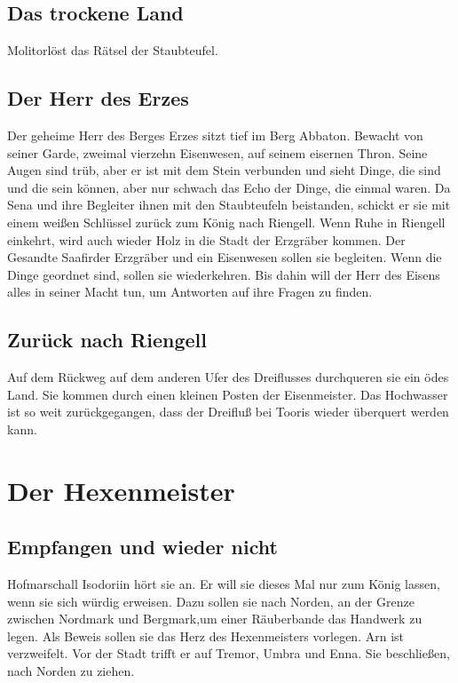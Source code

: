 \documentclass[12pt,a4paper,onecolumn,oneside,ngerman]{book}
\newcommand{\Molitor}{Molitor}
\newcommand{\Sena}{Sena}
\newcommand{\Umbra}{Umbra}
\newcommand{\Enna}{Enna}
\newcommand{\Tremor}{Tremor}
\newcommand{\Nordmark}{Nordmark}
\newcommand{\Bergmark}{Bergmark}
\newcommand{\Arn}{Arn}
\newcommand{\Rhingell}{Riengell}
\newcommand{\Isodoriin}{Isodoriin}
\newcommand{\Dreifluss}{Dreifluß}
\newcommand{\Toris}{Tooris}
\newcommand{\Eisenmeister}{Eisenmeister}
\newcommand{\Abaton}{Abbaton}
\newcommand{\Safir}{Saafir}
\newcommand{\Staubteufel}{Staubteufel}
\begin{document}
\chapter{Das trockene Land}
{\Molitor}löst das Rätsel der {\Staubteufel}.

\chapter{Der Herr des Erzes}
Der geheime Herr des Berges Erzes sitzt tief im Berg {\Abaton}. Bewacht von seiner Garde, zweimal vierzehn Eisenwesen, auf seinem eisernen Thron. Seine Augen sind trüb, aber er ist mit dem Stein verbunden und sieht Dinge, die sind und die sein können, aber nur schwach das Echo der Dinge, die einmal waren.\linebreak
Da {\Sena} und ihre Begleiter ihnen mit den Staubteufeln beistanden, schickt er sie mit einem weißen Schlüssel zurück zum König nach {\Rhingell}. Wenn Ruhe in {\Rhingell} einkehrt, wird auch wieder Holz in die Stadt der Erzgräber kommen. Der Gesandte \Safir der Erzgräber und ein Eisenwesen sollen sie begleiten.\linebreak
Wenn die Dinge geordnet sind, sollen sie wiederkehren. Bis dahin will der Herr des Eisens alles in seiner Macht tun, um Antworten auf ihre Fragen zu finden.

\chapter{Zurück nach {\Rhingell}}
Auf dem Rückweg auf dem anderen Ufer des Dreiflusses durchqueren sie ein ödes Land. Sie kommen durch einen kleinen Posten der {\Eisenmeister}.\linebreak 
Das Hochwasser ist so weit zurückgegangen, dass der {\Dreifluss} bei {\Toris} wieder überquert werden kann.

\part{Der Hexenmeister}
\chapter{Empfangen und wieder nicht}
Hofmarschall {\Isodoriin} hört sie an. Er will sie dieses Mal nur zum König lassen, wenn sie sich würdig erweisen. Dazu sollen sie nach Norden, an der Grenze zwischen {\Nordmark} und {\Bergmark},um einer Räuberbande das Handwerk zu legen. Als Beweis sollen sie das Herz des Hexenmeisters vorlegen.\linebreak
{\Arn} ist verzweifelt. Vor der Stadt trifft er auf {\Tremor}, {\Umbra} und {\Enna}. Sie beschließen, nach Norden zu ziehen.
\end{document}
